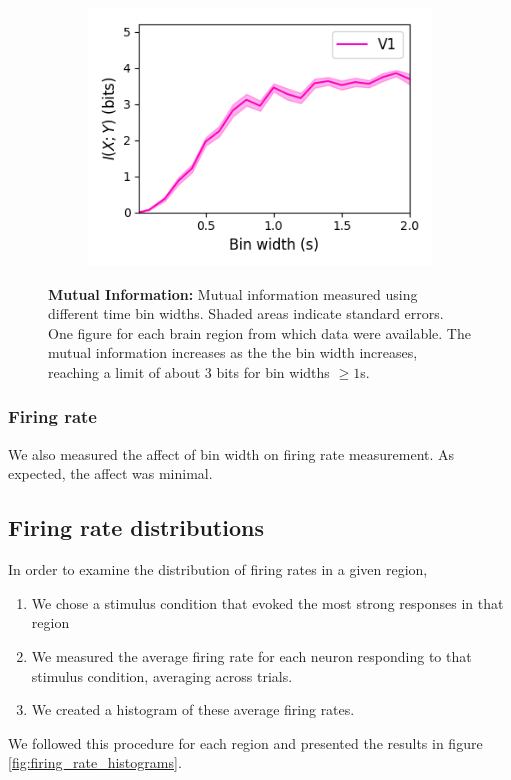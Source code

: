\documentclass[a4paper,12pt]{article}
\theoremstyle{definition}
\begin{document}
\begin{figure}[p]
\begin{subfigure}{0.5\textwidth}
    \includegraphics[width=\textwidth]{figures/linear_mutual_info_by_bin_width_v1_6.png}
  \end{subfigure}
  \caption{\textbf{Mutual Information:} Mutual information measured using different time bin widths. Shaded areas indicate standard errors. One figure for each brain region from which data were available. The mutual information increases as the the bin width increases, reaching a limit of about $3$ bits for bin widths $\geq 1$s.}
  \label{fig:linear_bin_width_vs_mutual_information_by_region}
\end{figure}

\subsubsection{Firing rate}
We also measured the affect of bin width on firing rate measurement. As expected, the affect was minimal.

\subsection{Firing rate distributions}
In order to examine the distribution of firing rates in a given region,
\begin{enumerate}
  \item We chose a stimulus condition that evoked the most strong responses in that region
  \item We measured the average firing rate for each neuron responding to that stimulus condition, averaging across trials.
  \item We created a histogram of these average firing rates.
\end{enumerate}
We followed this procedure for each region and presented the results in figure \ref{fig:firing_rate_histograms}.
\end{document}
